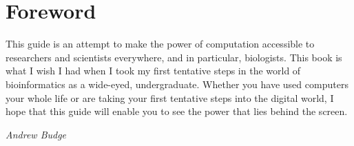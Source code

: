 \chapter*{Foreword}

This guide is an attempt to make the power of computation accessible to researchers and scientists everywhere, and in particular, biologists. This book is what I wish I had when I took my first tentative steps in the world of bioinformatics as a wide-eyed, undergraduate. Whether you have used computers your whole life or are taking your first tentative steps into the digital world, I hope that this guide will enable you to see the power that lies behind the screen.

\vspace{1em}
\noindent\textit{Andrew Budge}
